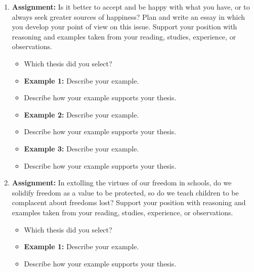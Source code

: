 \begin{enumerate}

\item \textbf{Assignment:} Is it better to accept and be happy with what you have, or to always seek greater sources of happiness? Plan and write an essay in which you develop your point of view on this issue. Support your position with reasoning and examples taken from your reading, studies, experience, or observations.

\begin{itemize}
\item Which thesis did you select? \hrulefill
\item \textbf{Example 1:} Describe your example. \hrulefill

\hrulefill

\item Describe how your example supports your thesis. \hrulefill

\hrulefill

\item \textbf{Example 2:} Describe your example. \hrulefill

\hrulefill

\item Describe how your example supports your thesis. \hrulefill

\hrulefill

\item \textbf{Example 3:} Describe your example. \hrulefill

\hrulefill

\item Describe how your example supports your thesis. \hrulefill

\hrulefill
\end{itemize}

\item \textbf{Assignment:} In extolling the virtues of our freedom in schools, do we solidify freedom as a value to be protected, so do we teach children to be complacent about freedoms lost? Support your position with reasoning and examples taken from your reading, studies, experience, or observations.

\begin{itemize}
\item Which thesis did you select? \hrulefill
\item \textbf{Example 1:} Describe your example. \hrulefill

\hrulefill

\item Describe how your example supports your thesis. \hrulefill


\end{itemize}
\end{enumerate}
